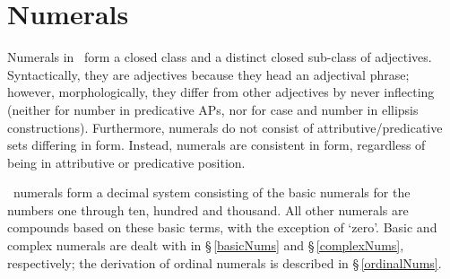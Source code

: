 \section{Numerals}\label{numerals}
Numerals in \PS\ form a closed class and a distinct closed sub-class of adjectives. Syntactically, they are adjectives because they head an adjectival phrase; however, morphologically, they differ from other adjectives by never inflecting (neither for number in predicative APs, nor for case and number in ellipsis constructions). 
Furthermore, numerals do not consist of attributive/predicative sets differing in form. %
Instead, numerals are consistent in form, regardless of being in attributive or predicative position. %

\PS\ numerals form a decimal system consisting of the basic numerals for the numbers one through ten, hundred and thousand. All other numerals are compounds based on these basic terms, with the exception of  ‘zero’. Basic and complex numerals are dealt with in §\,\ref{basicNums} and §\,\ref{complexNums}, respectively; the derivation of ordinal numerals is described in §\,\ref{ordinalNums}. %

